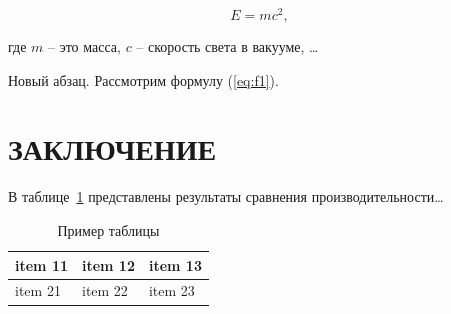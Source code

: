 \documentclass{studrep}
\begin{document}
\begin{equation}
  \label{eq:f1}
  E=mc^2,
\end{equation}

\noindent{}где $m$ -- это масса, $c$ -- скорость света в вакууме, \ldots

Новый абзац. Рассмотрим формулу (\ref{eq:f1}).


\chapter*{ЗАКЛЮЧЕНИЕ}

В таблице~\ref{tbl:ex} представлены результаты сравнения производительности\ldots

\begin{table}[hb]
  \caption{Пример таблицы}\label{tbl:ex}
  \centering
\begin{tabularx}{1\textwidth} {
  | >{\raggedright\arraybackslash}X
  | >{\centering\arraybackslash}X
  | >{\raggedleft\arraybackslash}X | }
 \hline
 item 11 & item 12 & item 13 \\
 \hline
 item 21  & item 22  & item 23  \\
\hline
\end{tabularx}
\end{table}
\end{document}
